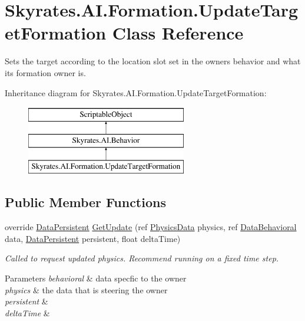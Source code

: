 \hypertarget{class_skyrates_1_1_a_i_1_1_formation_1_1_update_target_formation}{\section{Skyrates.\-A\-I.\-Formation.\-Update\-Target\-Formation Class Reference}
\label{class_skyrates_1_1_a_i_1_1_formation_1_1_update_target_formation}
}


Sets the target according to the location slot set in the owners behavior and what its formation owner is.  


Inheritance diagram for Skyrates.\-A\-I.\-Formation.\-Update\-Target\-Formation\-:\begin{figure}[H]
\begin{center}
\leavevmode
\includegraphics[height=3.000000cm]{class_skyrates_1_1_a_i_1_1_formation_1_1_update_target_formation}
\end{center}
\end{figure}
\subsection*{Public Member Functions}
\begin{DoxyCompactItemize}
\item 
\hypertarget{class_skyrates_1_1_a_i_1_1_formation_1_1_update_target_formation_a25716ab84afb4ef5b19e52c8a114fa2a}{override \hyperlink{class_skyrates_1_1_a_i_1_1_behavior_1_1_data_persistent}{Data\-Persistent} \hyperlink{class_skyrates_1_1_a_i_1_1_formation_1_1_update_target_formation_a25716ab84afb4ef5b19e52c8a114fa2a}{Get\-Update} (ref \hyperlink{class_skyrates_1_1_physics_1_1_physics_data}{Physics\-Data} physics, ref \hyperlink{class_skyrates_1_1_a_i_1_1_behavior_1_1_data_behavioral}{Data\-Behavioral} data, \hyperlink{class_skyrates_1_1_a_i_1_1_behavior_1_1_data_persistent}{Data\-Persistent} persistent, float delta\-Time)}\label{class_skyrates_1_1_a_i_1_1_formation_1_1_update_target_formation_a25716ab84afb4ef5b19e52c8a114fa2a}

\begin{DoxyCompactList}\small\item\em Called to request updated physics. Recommend running on a fixed time step. 


\begin{DoxyParams}{Parameters}
{\em behavioral} & data specfic to the owner\\
\hline
{\em physics} & the data that is steering the owner\\
\hline
{\em persistent} & \\
\hline
{\em delta\-Time} & \\
\hline
\end{DoxyParams}
 \end{DoxyCompactList}\end{DoxyCompactItemize}
